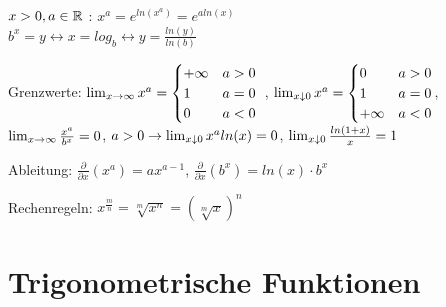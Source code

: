 \documentclass[]{article}
\begin{document}
\begin{definition}
 $\medspace$	\\ $x > 0, a \in \mathbb{R}$ : $x^a = e^{ln(x^a)} = e^{a ln(x)}$ \\ $b^x = y \leftrightarrow x = log_b \leftrightarrow y = \frac{ln (y)}{ln(b)}$
	\begin{description} [noitemsep]
		\item Grenzwerte: $\lim_{x \rightarrow \infty} x^a = \begin{cases}
		+ \infty & a > 0 \\ 
		1        & a = 0  \\
		0        & a < 0
		\end{cases} \medspace \medspace $,
		$\lim_{x \downarrow 0} x^a = \begin{cases}
		0        & a > 0 \\ 
		1        & a = 0  \\
		+ \infty & a < 0
		\end{cases}$,\\
		 $\lim_{x \rightarrow \infty} \frac{x^a}{b^x} = 0$, $a > 0 \rightarrow \lim_{x \downarrow 0} x^a ln(x) = 0$, $\lim_{x \downarrow 0} \frac{ln(1+x)}{x} = 1$
		\item Ableitung: $\frac{\partial}{\partial x} (x^a) = a x^{a - 1}$, $\frac{\partial}{\partial x}(b^x) = ln(x) \cdot b^x$
		\item Rechenregeln: $x^{\frac{m}{n}} = \sqrt[m]{x^n} = (\sqrt[m]{x})^n$
	\end{description}
\end{definition}

\pagebreak

\section{Trigonometrische Funktionen}
\end{document}
